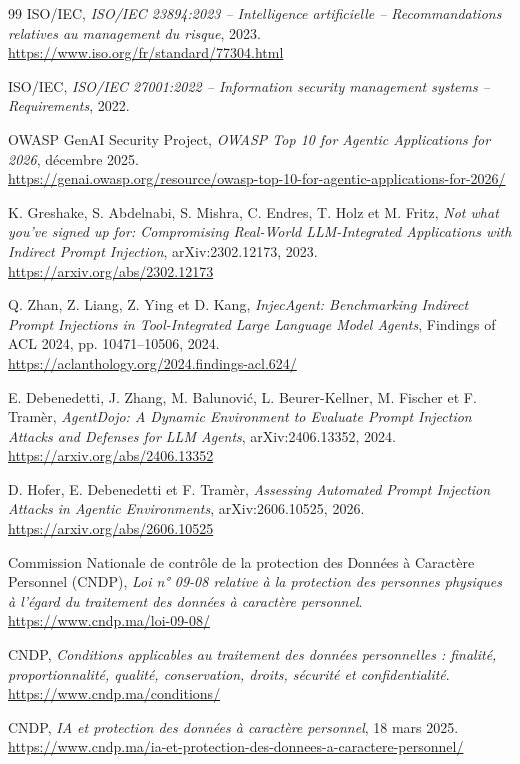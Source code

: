 \begin{thebibliography}{99}
ISO/IEC, \emph{ISO/IEC 23894:2023 -- Intelligence artificielle -- Recommandations relatives au management du risque}, 2023.\\
\url{https://www.iso.org/fr/standard/77304.html}

ISO/IEC, \emph{ISO/IEC 27001:2022 -- Information security management systems -- Requirements}, 2022.

OWASP GenAI Security Project, \emph{OWASP Top 10 for Agentic Applications for 2026}, décembre 2025.\\
\url{https://genai.owasp.org/resource/owasp-top-10-for-agentic-applications-for-2026/}

K. Greshake, S. Abdelnabi, S. Mishra, C. Endres, T. Holz et M. Fritz, \emph{Not what you've signed up for: Compromising Real-World LLM-Integrated Applications with Indirect Prompt Injection}, arXiv:2302.12173, 2023.\\
\url{https://arxiv.org/abs/2302.12173}

Q. Zhan, Z. Liang, Z. Ying et D. Kang, \emph{InjecAgent: Benchmarking Indirect Prompt Injections in Tool-Integrated Large Language Model Agents}, Findings of ACL 2024, pp. 10471--10506, 2024.\\
\url{https://aclanthology.org/2024.findings-acl.624/}

E. Debenedetti, J. Zhang, M. Balunović, L. Beurer-Kellner, M. Fischer et F. Tramèr, \emph{AgentDojo: A Dynamic Environment to Evaluate Prompt Injection Attacks and Defenses for LLM Agents}, arXiv:2406.13352, 2024.\\
\url{https://arxiv.org/abs/2406.13352}

D. Hofer, E. Debenedetti et F. Tramèr, \emph{Assessing Automated Prompt Injection Attacks in Agentic Environments}, arXiv:2606.10525, 2026.\\
\url{https://arxiv.org/abs/2606.10525}

Commission Nationale de contrôle de la protection des Données à Caractère Personnel (CNDP), \emph{Loi n° 09-08 relative à la protection des personnes physiques à l'égard du traitement des données à caractère personnel}.\\
\url{https://www.cndp.ma/loi-09-08/}

CNDP, \emph{Conditions applicables au traitement des données personnelles : finalité, proportionnalité, qualité, conservation, droits, sécurité et confidentialité}.\\
\url{https://www.cndp.ma/conditions/}

CNDP, \emph{IA et protection des données à caractère personnel}, 18 mars 2025.\\
\url{https://www.cndp.ma/ia-et-protection-des-donnees-a-caractere-personnel/}

\end{thebibliography}
